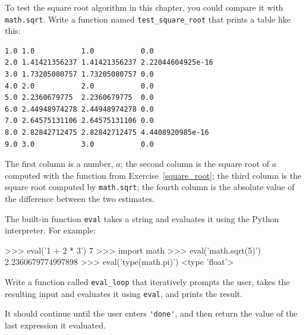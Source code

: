 \begin{exercise}


To test the square root algorithm in this chapter, you could compare
it with {\tt math.sqrt}.  Write a function named \verb"test_square_root"
that prints a table like this:

\beforeverb
\begin{verbatim}
1.0 1.0           1.0           0.0
2.0 1.41421356237 1.41421356237 2.22044604925e-16
3.0 1.73205080757 1.73205080757 0.0
4.0 2.0           2.0           0.0
5.0 2.2360679775  2.2360679775  0.0
6.0 2.44948974278 2.44948974278 0.0
7.0 2.64575131106 2.64575131106 0.0
8.0 2.82842712475 2.82842712475 4.4408920985e-16
9.0 3.0           3.0           0.0

\end{verbatim}
\afterverb
%
The first column is a number, $a$; the second column is
the square root of $a$ computed with the function from
Exercise~\ref{square_root}; the third column is the square root computed
by {\tt math.sqrt}; the fourth column is the absolute value
of the difference between the two estimates.
\end{exercise}


\begin{exercise}


The built-in function {\tt eval} takes a string and evaluates
it using the Python interpreter.  For example:

\beforeverb
\begin{pyexo}
>>> eval('1 + 2 * 3')
7
>>> import math
>>> eval('math.sqrt(5)')
2.2360679774997898
>>> eval('type(math.pi)')
<type 'float'>
\end{pyexo}
\afterverb
%
Write a function called \verb"eval_loop" that iteratively
prompts the user, takes the resulting input and evaluates
it using {\tt eval}, and prints the result.

It should continue until the user enters \verb"'done'", and then
return the value of the last expression it evaluated.

\end{exercise}



